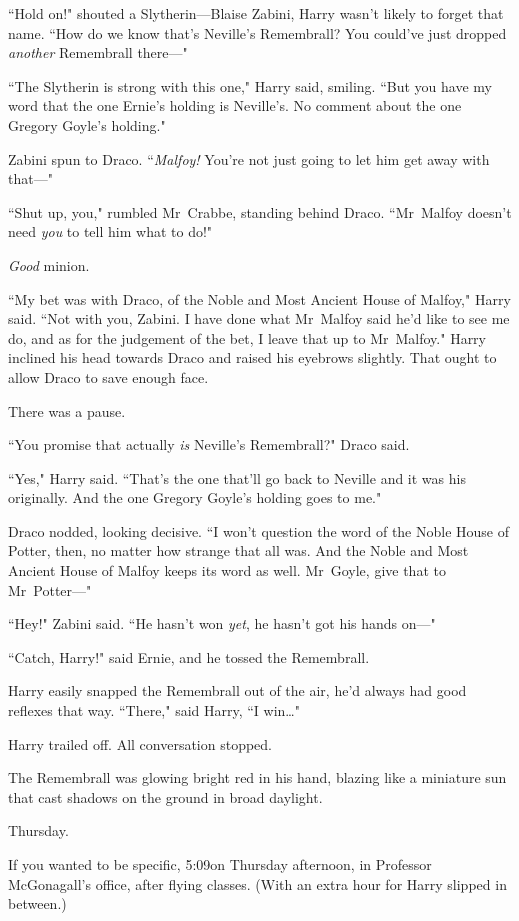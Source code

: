 ``Hold on!" shouted a Slytherin—Blaise Zabini, Harry wasn't likely to forget that name. ``How do we know that's Neville's Remembrall? You could've just dropped \emph{another} Remembrall there—"

``The Slytherin is strong with this one," Harry said, smiling. ``But you have my word that the one Ernie's holding is Neville's. No comment about the one Gregory Goyle's holding."

Zabini spun to Draco. ``\emph{Malfoy!} You're not just going to let him get away with that—"

``Shut up, you," rumbled Mr~Crabbe, standing behind Draco. ``Mr~Malfoy doesn't need \emph{you} to tell him what to do!"

\emph{Good} minion.

``My bet was with Draco, of the Noble and Most Ancient House of Malfoy," Harry said. ``Not with you, Zabini. I have done what Mr~Malfoy said he'd like to see me do, and as for the judgement of the bet, I leave that up to Mr~Malfoy." Harry inclined his head towards Draco and raised his eyebrows slightly. That ought to allow Draco to save enough face.

There was a pause.

``You promise that actually \emph{is} Neville's Remembrall?" Draco said.

``Yes," Harry said. ``That's the one that'll go back to Neville and it was his originally. And the one Gregory Goyle's holding goes to me."

Draco nodded, looking decisive. ``I won't question the word of the Noble House of Potter, then, no matter how strange that all was. And the Noble and Most Ancient House of Malfoy keeps its word as well. Mr~Goyle, give that to Mr~Potter—"

``Hey!" Zabini said. ``He hasn't won \emph{yet}, he hasn't got his hands on—"

``Catch, Harry!" said Ernie, and he tossed the Remembrall.

Harry easily snapped the Remembrall out of the air, he'd always had good reflexes that way. ``There," said Harry, ``I win…"

Harry trailed off. All conversation stopped.

The Remembrall was glowing bright red in his hand, blazing like a miniature sun that cast shadows on the ground in broad daylight.

\later

Thursday.

If you wanted to be specific, 5:09\pm on Thursday afternoon, in Professor McGonagall's office, after flying classes. (With an extra hour for Harry slipped in between.)


